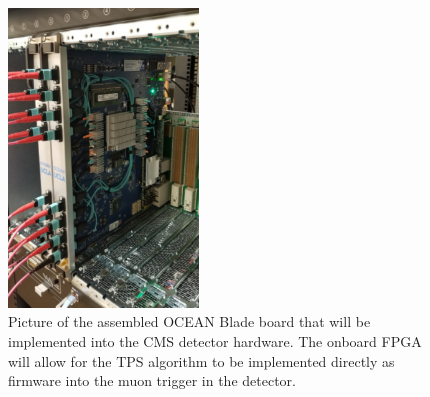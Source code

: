 \begin{figure}[htbp] %
  \centering
  \includegraphics[width=0.45\textwidth]{fig/TPS/ocean.pdf}
  \caption{
    Picture of the assembled OCEAN Blade board that will be implemented into the CMS detector hardware.
    The onboard FPGA will allow for the TPS algorithm to be implemented directly as firmware into the muon trigger in the detector.
  }
  \label{fig:ocean}
\end{figure}
